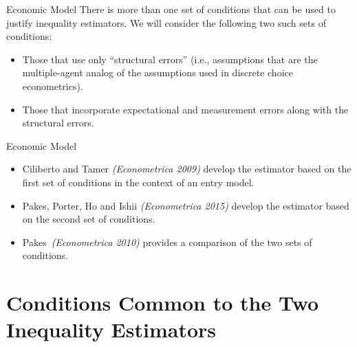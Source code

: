 
\begin{frame}{Economic Model}
There is more than one set of conditions that can be used to justify
inequality estimators.  We will consider the following two such sets of conditions:\\
\begin{itemize}
\vspace{0.1in}
\item Those that use only ``structural errors'' (i.e., assumptions
that are the multiple-agent analog of the assumptions used in discrete
choice econometrics). \\
\vspace{0.1in}
\item Those that incorporate expectational and measurement errors along with the structural errors.\\
\end{itemize}
\end{frame}

\begin{frame}{Economic Model}
\begin{itemize}
\item  Ciliberto and Tamer \textit{(Econometrica 2009)} develop the estimator based on the first set of conditions in the context of an entry model.\\
\vspace{0.1in}
\item Pakes, Porter, Ho and Ishii \textit{(Econometrica 2015)} develop the estimator based on the second set of conditions.\\
\vspace{0.1in}
\item  Pakes\ \textit{(Econometrica 2010)} provides a comparison of the two sets of conditions.\\
\end{itemize}
\end{frame}

\section{Conditions Common to the Two Inequality Estimators}


